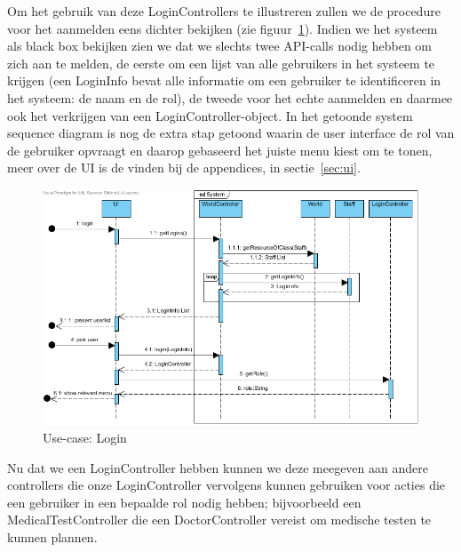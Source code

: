 \documentclass[a4paper]{article}
\begin{document}
Om het gebruik van deze LoginControllers te illustreren zullen we de procedure voor het aanmelden eens dichter bekijken (zie figuur~\ref{fig:login}).
Indien we het systeem als black box bekijken zien we dat we slechts twee API-calls nodig hebben om zich aan te melden, de eerste om een lijst van alle gebruikers in het systeem te krijgen (een LoginInfo bevat alle informatie om een gebruiker te identificeren in het systeem: de naam en de rol), de tweede voor het echte aanmelden en daarmee ook het verkrijgen van een LoginController-object. In het getoonde system sequence diagram is nog de extra stap getoond waarin de user interface de rol van de gebruiker opvraagt en daarop gebaseerd het juiste menu kiest om te tonen, meer over de UI is de vinden bij de appendices, in sectie~\ref{sec:ui}.
\begin{figure}[h]
\centering
\includegraphics[width=\textwidth]{Pictures/Login}
\caption{Use-case: Login}
\label{fig:login}
\end{figure}

Nu dat we een LoginController hebben kunnen we deze meegeven aan andere controllers die onze LoginController vervolgens kunnen gebruiken voor acties die een gebruiker in een bepaalde rol nodig hebben; bijvoorbeeld een MedicalTestController die een DoctorController vereist om medische testen te kunnen plannen.
\end{document}
